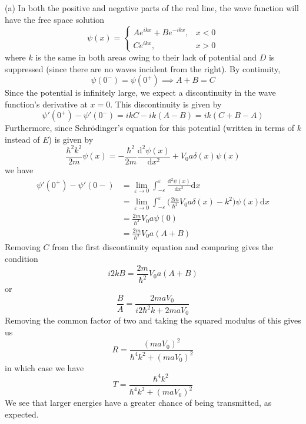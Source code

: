 \documentclass[../principles-of-quantum-mechanics.tex]{subfiles}
\begin{document}
\begin{questions}
	\begin{solution}
		(a) In both the positive and negative parts of the real line, the wave function will have the free space solution
		$$\psi(x) = \begin{cases}Ae^{ikx} + Be^{-ikx}, &x < 0 \\Ce^{ikx}, &x > 0\end{cases}$$
		where $k$ is the same in both areas owing to their lack of potential and $D$ is suppressed (since there are no waves incident from the right). By continuity,
		$$\psi(0^-) = \psi(0^+) \implies A + B = C$$
		Since the potential is infinitely large, we expect a discontinuity in the wave function's derivative at $x = 0$. This discontinuity is given by
		$$\psi'(0^+) - \psi'(0^-) = ikC - ik(A - B) = ik(C + B - A)$$
		Furthermore, since Schr\"odinger's equation for this potential (written in terms of $k$ instead of $E$) is given by
		$$\frac{\hbar^2k^2}{2m}\psi(x) = -\frac{\hbar^2}{2m}\frac{\mathrm{d}^2\psi(x)}{\mathrm{d}x^2} + V_0a\delta(x)\psi(x)$$
		we have
		\begin{align*}
			\psi'(0^+) - \psi'(0-) &= \lim_{\varepsilon\to 0}\int_{-\varepsilon}^{\varepsilon}\frac{\mathrm{d}^2\psi(x)}{\mathrm{d}x^2}\mathrm{d}x \\
			&= \lim_{\varepsilon\to 0}\int_{-\varepsilon}^{\varepsilon}\Big(\frac{2m}{\hbar^2}V_0a\delta(x) - k^2\Big)\psi(x)\mathrm{d}x \\
			&= \frac{2m}{\hbar^2}V_0a\psi(0) \\
			&= \frac{2m}{\hbar^2}V_0a(A + B)
		\end{align*}
		Removing $C$ from the first discontinuity equation and comparing gives the condition
		$$i2kB = \frac{2m}{\hbar^2}V_0a(A + B)$$
		or
		$$\frac{B}{A} = \frac{2maV_0}{i2\hbar^2k + 2maV_0}$$
		Removing the common factor of two and taking the squared modulus of this gives us
		$$R = \frac{(maV_0)^2}{\hbar^4k^2 + (maV_0)^2}$$
		in which case we have
		$$T = \frac{\hbar^4k^2}{\hbar^4k^2 + (maV_0)^2}$$
		We see that larger energies have a greater chance of being transmitted, as expected. 
		

\end{solution}
\end{questions}
\end{document}
